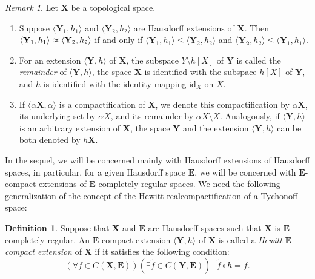 \documentclass[12pt,twoside,leqno]{article}
\theoremstyle{plain}
\theoremstyle{definition}
\newtheorem{definition}[theorem]{Definition}
\theoremstyle{remark}
\newtheorem{remark}[theorem]{Remark}
\begin{document}
\begin{remark}
	\label{s1:r4} 
	Let $\mathbf{X}$ be a topological space.
	\begin{enumerate}
		\item[(i)]Suppose $\langle \mathbf{Y}_1, h_1\rangle$ and $\langle \mathbf{Y}_2, h_2\rangle$ are Hausdorff extensions of $\mathbf{X}$. Then $\langle \mathbf{Y}_1, h_1\rangle\thickapprox \langle\mathbf{Y}_2, h_2\rangle$ if and only if $\langle \mathbf{Y}_1, h_1\rangle\leq \langle\mathbf{Y}_2, h_2\rangle$ and $\langle \mathbf{Y_2}, h_2\rangle\leq\langle \mathbf{Y}_1, h_1\rangle$.  
		
		\item[(ii)] For an extension $\langle\mathbf{Y}, h\rangle$ of $\mathbf{X}$, the subspace $Y\setminus h[X]$ of $\mathbf{Y}$ is called the \emph{remainder} of $\langle\mathbf{Y}, h\rangle$, the space $\mathbf{X}$ is identified with the subspace $h[X]$ of $\mathbf{Y}$, and $h$ is identified  with the identity mapping $\text{id}_{X}$ on $X$. 
		
		\item[(iii)] If $\langle \alpha\mathbf{X}, \alpha\rangle$ is a compactification of $\mathbf{X}$, we denote this compactification by $\alpha\mathbf{X}$, its underlying set by $\alpha X$,  and its remainder by $\alpha X\setminus X$. Analogously, if $\langle \mathbf{Y}, h\rangle$ is an arbitrary extension of $\mathbf{X}$, the space $\mathbf{Y}$ and the extension $\langle \mathbf{Y}, h\rangle$ can be both denoted by $h\mathbf{X}$.
	\end{enumerate}
\end{remark} 

In the sequel, we will be concerned mainly with Hausdorff extensions of Hausdorff spaces, in particular, for a given Hausdorff space $\mathbf{E}$, we will be concerned  with $\mathbf{E}$-compact extensions of $\mathbf{E}$-completely regular spaces.
We need the following generalization of the concept of the Hewitt realcompactification of a Tychonoff space:

\begin{definition}
	\label{s1:d5}
	Suppose that $\mathbf{X}$ and $\mathbf{E}$ are Hausdorff spaces such that $\mathbf{X}$ is $\mathbf{E}$-completely regular.
	An $\mathbf{E}$-compact extension $\langle \mathbf{Y}, h\rangle$ of $\mathbf{X}$ is called  a \emph{Hewitt} $\mathbf{E}$-\emph{compact extension} of $\mathbf{X}$ if it satisfies  the following condition:
	$$(\forall f\in C(\mathbf{X}, \mathbf{E}))(\exists \tilde{f}\in C(\mathbf{Y}, \mathbf{E}))\text{ } \tilde{f}\circ h=f.$$
\end{definition}
\end{document}
